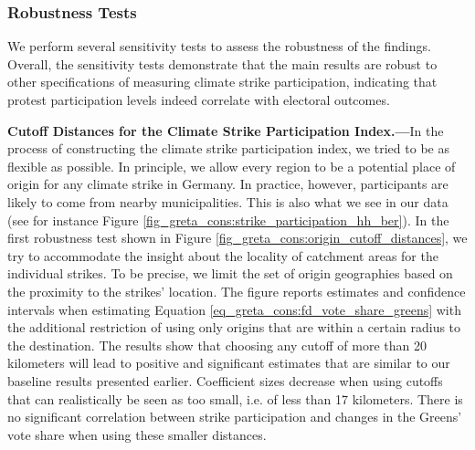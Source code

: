 \subsubsection{Robustness Tests}

We perform several sensitivity tests to assess the robustness of the findings. Overall, the sensitivity tests demonstrate that the main results are robust to other specifications of measuring climate strike participation, indicating that protest participation levels indeed correlate with electoral outcomes.



\textbf{Cutoff Distances for the Climate Strike Participation Index.---}In the process of constructing the climate strike participation index, we tried to be as flexible as possible. In principle, we allow every region to be a potential place of origin for any climate strike in Germany. In practice, however, participants are likely to come from nearby municipalities. This is also what we see in our data (see for instance Figure \ref{fig_greta_cons:strike_participation_hh_ber}). In the first robustness test shown in Figure \ref{fig_greta_cons:origin_cutoff_distances}, we try to accommodate the insight about the locality of catchment areas for the individual strikes. To be precise, we limit the set of origin geographies based on the proximity to the strikes' location. The figure reports estimates and confidence intervals when estimating Equation \ref{eq_greta_cons:fd_vote_share_greens} with the additional restriction of using only origins that are within a certain radius to the destination. The results show that choosing any cutoff of more than 20 kilometers will lead to positive and significant estimates that are similar to our baseline results presented earlier. Coefficient sizes decrease when using cutoffs that can realistically be seen as too small, i.e. of less than 17 kilometers. There is no significant correlation between strike participation and changes in the Greens' vote share when using these smaller distances.


